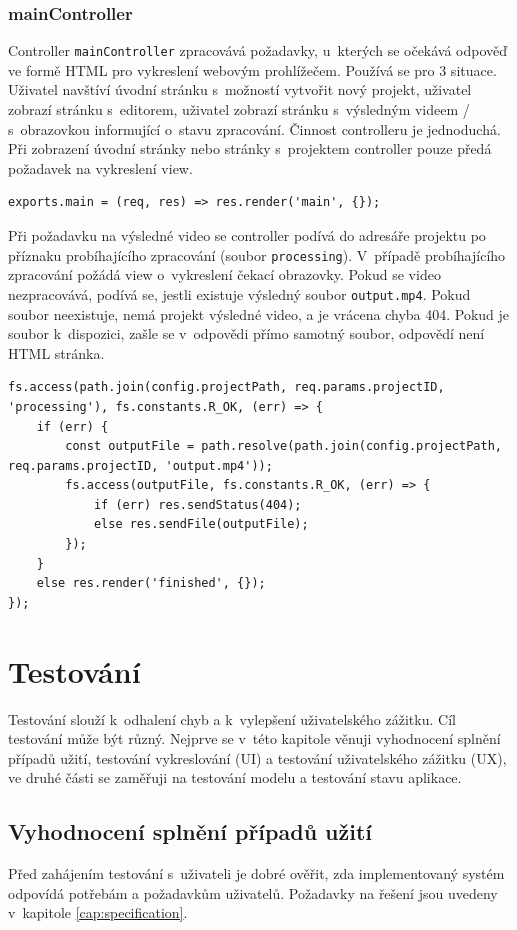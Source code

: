 \subsection{mainController}
Controller \texttt{mainController} zpracovává požadavky, u~kterých se očekává odpověď ve formě HTML pro vykreslení webovým prohlížečem. Používá se pro 3 situace. Uživatel navštíví úvodní stránku s~možností vytvořit nový projekt, uživatel zobrazí stránku s~editorem, uživatel zobrazí stránku s~výsledným videem / s~obrazovkou informující o~stavu zpracování. Činnost controlleru je jednoduchá. Při zobrazení úvodní stránky nebo stránky s~projektem controller pouze předá požadavek na vykreslení view.
\begin{lstlisting}[style=JavaScript]
exports.main = (req, res) => res.render('main', {});
\end{lstlisting}

Při požadavku na výsledné video se controller podívá do adresáře projektu po příznaku probíhajícího zpracování (soubor \texttt{processing}). V~případě probíhajícího zpracování požádá view o~vykreslení čekací obrazovky. Pokud se video nezpracovává, podívá se, jestli existuje výsledný soubor \texttt{output.mp4}. Pokud soubor neexistuje, nemá projekt výsledné video, a je vrácena chyba 404. Pokud je soubor k~dispozici, zašle se v~odpovědi přímo samotný soubor, odpovědí není HTML stránka.
\begin{lstlisting}[style=JavaScript]
fs.access(path.join(config.projectPath, req.params.projectID, 'processing'), fs.constants.R_OK, (err) => {
    if (err) {
        const outputFile = path.resolve(path.join(config.projectPath, req.params.projectID, 'output.mp4'));
        fs.access(outputFile, fs.constants.R_OK, (err) => {
            if (err) res.sendStatus(404);
            else res.sendFile(outputFile);
        });
    }
    else res.render('finished', {});
});
\end{lstlisting}

\chapter{Testování}
Testování slouží k~odhalení chyb a k~vylepšení uživatelského zážitku. Cíl testování může být různý. Nejprve se v~této kapitole věnuji vyhodnocení splnění případů užití, testování vykreslování (UI) a testování uživatelského zážitku (UX), ve druhé části se zaměřuji na testování modelu a testování stavu aplikace.

\section{Vyhodnocení splnění případů užití}
Před zahájením testování s~uživateli je dobré ověřit, zda implementovaný systém odpovídá potřebám a požadavkům uživatelů. Požadavky na řešení jsou uvedeny v~kapitole \ref{cap:specification}.

